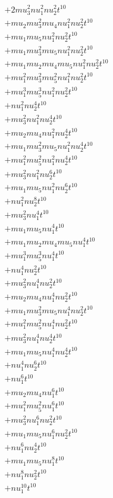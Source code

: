 \begin{align*}
  + 2 mu_3^{2} nu_1^{2} nu_2^{2} t^{10} \\
  + mu_2 mu_3^{2} mu_4 nu_1^{2} nu_2^{2} t^{10} \\
  + mu_1 mu_5 nu_1^{2} nu_2^{2} t^{10} \\
  + mu_1 mu_3^{2} mu_5 nu_1^{2} nu_2^{2} t^{10} \\
  + mu_1 mu_2 mu_4 mu_5 nu_1^{2} nu_2^{2} t^{10} \\
  + mu_1^{2} mu_3^{2} mu_5^{2} nu_1^{2} nu_2^{2} t^{10} \\
  + mu_1^{3} mu_5^{3} nu_1^{2} nu_2^{2} t^{10} \\
  + nu_1^{2} nu_2^{4} t^{10} \\
  + mu_3^{2} nu_1^{2} nu_2^{4} t^{10} \\
  + mu_2 mu_4 nu_1^{2} nu_2^{4} t^{10} \\
  + mu_1 mu_3^{2} mu_5 nu_1^{2} nu_2^{4} t^{10} \\
  + mu_1^{2} mu_5^{2} nu_1^{2} nu_2^{4} t^{10} \\
  + mu_3^{2} nu_1^{2} nu_2^{6} t^{10} \\
  + mu_1 mu_5 nu_1^{2} nu_2^{6} t^{10} \\
  + nu_1^{2} nu_2^{8} t^{10} \\
  + mu_3^{2} nu_1^{4} t^{10} \\
  + mu_1 mu_5 nu_1^{4} t^{10} \\
  + mu_1 mu_2 mu_4 mu_5 nu_1^{4} t^{10} \\
  + mu_1^{3} mu_5^{3} nu_1^{4} t^{10} \\
  + nu_1^{4} nu_2^{2} t^{10} \\
  + mu_3^{2} nu_1^{4} nu_2^{2} t^{10} \\
  + mu_2 mu_4 nu_1^{4} nu_2^{2} t^{10} \\
  + mu_1 mu_3^{2} mu_5 nu_1^{4} nu_2^{2} t^{10} \\
  + mu_1^{2} mu_5^{2} nu_1^{4} nu_2^{2} t^{10} \\
  + mu_3^{2} nu_1^{4} nu_2^{4} t^{10} \\
  + mu_1 mu_5 nu_1^{4} nu_2^{4} t^{10} \\
  + nu_1^{4} nu_2^{6} t^{10} \\
  + nu_1^{6} t^{10} \\
  + mu_2 mu_4 nu_1^{6} t^{10} \\
  + mu_1^{2} mu_5^{2} nu_1^{6} t^{10} \\
  + mu_3^{2} nu_1^{6} nu_2^{2} t^{10} \\
  + mu_1 mu_5 nu_1^{6} nu_2^{2} t^{10} \\
  + nu_1^{6} nu_2^{4} t^{10} \\
  + mu_1 mu_5 nu_1^{8} t^{10} \\
  + nu_1^{8} nu_2^{2} t^{10} \\
  + nu_1^{10} t^{10}
\end{align*}

